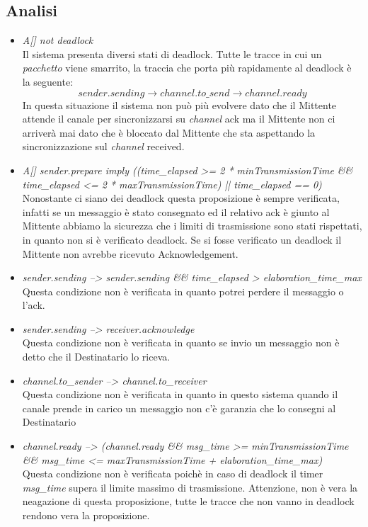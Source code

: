 \documentclass[a4paper]{article}
\newcommand{\channel}{\textit{channel }}
\newcommand{\pacchetto}{\textit{pacchetto }}
\begin{document}
\subsection{Analisi}
\begin{itemize}
	\item \textit{A[] not deadlock}\\
		Il sistema presenta diversi stati di deadlock. Tutte le tracce in cui un \pacchetto viene smarrito, la traccia che porta più rapidamente al deadlock è la seguente:
		$$ sender.sending \rightarrow channel.to\_send \rightarrow channel.ready $$
		In questa situazione il sistema non può più evolvere dato che il Mittente attende il canale per sincronizzarsi su \channel ack ma il Mittente non ci arriverà mai dato che è bloccato dal Mittente che sta aspettando la sincronizzazione sul \channel received.
	\item \textit{A[] sender.prepare imply ((time\_elapsed >= 2 * minTransmissionTime \&\& time\_elapsed <= 2 * maxTransmissionTime) || time\_elapsed == 0)}\\
		Nonostante ci siano dei deadlock questa proposizione è sempre verificata, infatti se un messaggio è stato consegnato ed il relativo ack è giunto al Mittente abbiamo la sicurezza che i limiti di trasmissione sono stati rispettati, in quanto non si è verificato deadlock.
		Se si fosse verificato un deadlock il Mittente non avrebbe ricevuto Acknowledgement.
	\item \textit{sender.sending --> sender.sending \&\& time\_elapsed > elaboration\_time\_max}\\
		Questa condizione non è verificata in quanto potrei perdere il messaggio o l'ack.
	\item \textit{sender.sending --> receiver.acknowledge}\\
		Questa condizione non è verificata in quanto se invio un messaggio non è detto che il Destinatario lo riceva.
	\item \textit{channel.to\_sender --> channel.to\_receiver}\\
		Questa condizione non è verificata in quanto in questo sistema quando il canale prende in carico un messaggio non c'è garanzia che lo consegni al Destinatario
	\item \textit{channel.ready --> (channel.ready \&\& msg\_time >= minTransmissionTime \&\& msg\_time <= maxTransmissionTime + elaboration\_time\_max)}\\
		Questa condizione non è verificata poichè in caso di deadlock il timer \textit{msg\_time} supera il limite massimo di trasmissione.
		Attenzione, non è vera la neagazione di questa proposizione, tutte le tracce che non vanno in deadlock rendono vera la proposizione.
\end{itemize}
\end{document}
